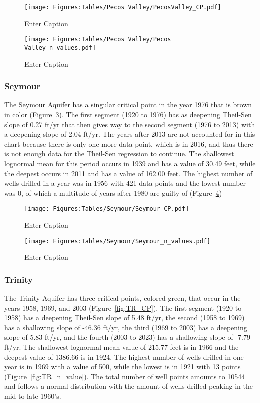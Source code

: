 \begin{figure}[H]
    \centering
    \texttt{[image: Figures:Tables/Pecos Valley/PecosValley\_CP.pdf]}
    \caption{Enter Caption}
    \label{fig:PV_CP}
\end{figure}

\begin{figure}[H]
    \centering
    \texttt{[image: Figures:Tables/Pecos Valley/Pecos Valley\_n\_values.pdf]}
    \caption{Enter Caption}
    \label{fig:PV_n_value}
\end{figure}

\subsubsection*{Seymour}
The Seymour Aquifer has a singular critical point in the year 1976 that is brown in color (Figure~\ref{fig:SM_CP}). The first segment (1920 to 1976) has as deepening Theil-Sen slope of 0.27 ft/yr that then gives way to the second segment (1976 to 2013) with a deepening slope of 2.04 ft/yr. The years after 2013 are not accounted for in this chart because there is only one more data point, which is in 2016, and thus there is not enough data for the Theil-Sen regression to continue. The shallowest lognormal mean for this period occurs in 1939 and has a value of 30.49 feet, while the deepest occurs in 2011 and has a value of 162.00 feet. The highest number of wells drilled in a year was in 1956 with 421 data points and the lowest number was 0, of which a multitude of years after 1980 are guilty of (Figure~\ref{fig:SM_n_value})

\begin{figure}[H]
    \centering
    \texttt{[image: Figures:Tables/Seymour/Seymour\_CP.pdf]}
    \caption{Enter Caption}
    \label{fig:SM_CP}
\end{figure}


\begin{figure}[H]
    \centering
    \texttt{[image: Figures:Tables/Seymour/Seymour\_n\_values.pdf]}
    \caption{Enter Caption}
    \label{fig:SM_n_value}
\end{figure}


\subsubsection*{Trinity}
The Trinity Aquifer has three critical points, colored green, that occur in the years 1958, 1969, and 2003 (Figure~\ref{fig:TR_CP}). The first segment (1920 to 1958) has a deepening Theil-Sen slope of 5.48 ft/yr, the second (1958 to 1969) has a shallowing slope of -46.36 ft/yr, the third (1969 to 2003) has a deepening slope of 5.83 ft/yr, and the fourth (2003 to 2023) has a shallowing slope of -7.79 ft/yr. The shallowest lognormal mean value of 215.77 feet is in 1966 and the deepest value of 1386.66 is in 1924. The highest number of wells drilled in one year is in 1969 with a value of 500, while the lowest is in 1921 with 13 points (Figure~\ref{fig:TR_n_value}). The total number of well points amounts to 10544 and follows a normal distribution with the amount of wells drilled peaking in the mid-to-late 1960’s. 

